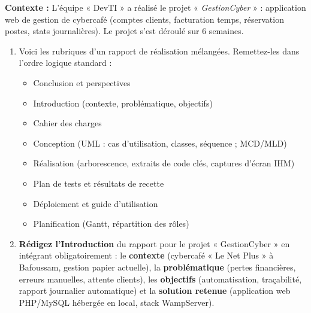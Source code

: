 \documentclass[11pt]{article}
\newcounter{popsec}
\newcounter{popsub}
\newcommand{\courssub}[1]{%
  \stepcounter{popsub}%
  \par\vspace{9pt}\noindent{\popxbold\fontsize{11.5}{13}\selectfont\color{popink}{\color{poporange}\thepopsec.\thepopsub}\hspace{6pt}#1}\par\nopagebreak\vspace{4pt}
}
\begin{document}
\courssub{Je me prépare au Bac}

\begin{exercice}
\textbf{Contexte :} L'équipe « DevTI » a réalisé le projet « \emph{GestionCyber} » : application web de gestion de cybercafé (comptes clients, facturation temps, réservation postes, stats journalières). Le projet s'est déroulé sur 6 semaines.
\begin{enumerate}
    \item Voici les rubriques d'un rapport de réalisation mélangées. Remettez-les dans l'ordre logique standard :
    \begin{itemize}
        \item Conclusion et perspectives
        \item Introduction (contexte, problématique, objectifs)
        \item Cahier des charges
        \item Conception (UML : cas d'utilisation, classes, séquence ; MCD/MLD)
        \item Réalisation (arborescence, extraits de code clés, captures d'écran IHM)
        \item Plan de tests et résultats de recette
        \item Déploiement et guide d'utilisation
        \item Planification (Gantt, répartition des rôles)
    \end{itemize}
    \item \textbf{Rédigez l'Introduction} du rapport pour le projet « GestionCyber » en intégrant obligatoirement : le \textbf{contexte} (cybercafé « Le Net Plus » à Bafoussam, gestion papier actuelle), la \textbf{problématique} (pertes financières, erreurs manuelles, attente clients), les \textbf{objectifs} (automatisation, traçabilité, rapport journalier automatique) et la \textbf{solution retenue} (application web PHP/MySQL hébergée en local, stack WampServer).
\end{enumerate}
\end{exercice}
\end{document}
